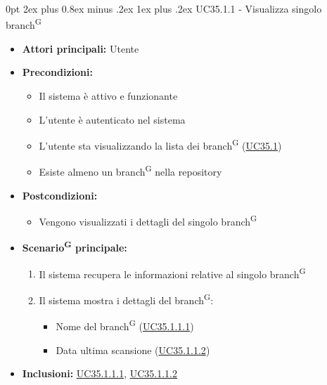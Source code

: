 \documentclass[a4paper, 11pt]{article}
\makeatletter
\renewcommand\subparagraph{\@startsection{subparagraph}{5}
  {0pt}
  {2ex plus 0.8ex minus .2ex}
  {1ex plus .2ex}
  {\normalfont\normalsize\bfseries\color{AccentColor}}}
\makeatother
\begin{document}
\subparagraph{UC35.1.1 - Visualizza singolo branch\textsuperscript{G}}\label{UC35.1.1}
\begin{itemize}
    \item \textbf{Attori principali:} Utente 
    \item \textbf{Precondizioni:}
    \begin{itemize}
        \item Il sistema è attivo e funzionante
        \item L'utente è autenticato nel sistema
        \item L'utente sta visualizzando la lista dei branch\textsuperscript{G} (\hyperref[UC35.1]{UC35.1})
        \item Esiste almeno un branch\textsuperscript{G} nella repository
    \end{itemize}
    \item \textbf{Postcondizioni:}
    \begin{itemize}
        \item Vengono visualizzati i dettagli del singolo branch\textsuperscript{G}
    \end{itemize}
    \item \textbf{Scenario\textsuperscript{G} principale:}
    \begin{enumerate}
        \item Il sistema recupera le informazioni relative al singolo branch\textsuperscript{G}
        \item Il sistema mostra i dettagli del branch\textsuperscript{G}:
        \begin{itemize}
            \item Nome del branch\textsuperscript{G} (\hyperref[UC35.1.1.1]{UC35.1.1.1})
            \item Data ultima scansione (\hyperref[UC35.1.1.2]{UC35.1.1.2})
        \end{itemize}
    \end{enumerate}
    \item \textbf{Inclusioni:} \hyperref[UC35.1.1.1]{UC35.1.1.1}, \hyperref[UC35.1.1.2]{UC35.1.1.2}
\end{itemize}
\end{document}

